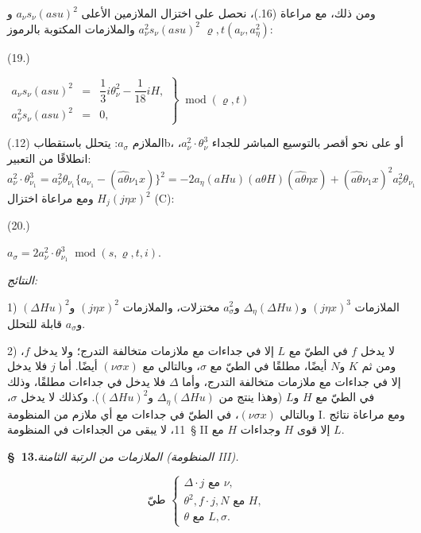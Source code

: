 \documentclass[11pt]{article}
\providecommand{\A}{\Delta}
\providecommand{\R}{\varrho}
\providecommand{\modu}[1]{\;\operatorname{mod} #1}
\begin{document}
ومن ذلك، مع مراعاة (16.)، نحصل على اختزال الملازمين الأعلى $a_\nu s_\nu(asu)^2$ و$a_\nu^2s_\nu(asu)^2$ والملازمات المكتوبة بالرموز $\R,t(a_\nu,a_\eta^2)$:
\par\smallskip\noindent
\begin{minipage}[c]{4.8em}
\centering (19.)
\end{minipage}%
\begin{minipage}[c]{\dimexpr\linewidth-4.8em\relax}
\centering
\(\displaystyle
\left.\begin{array}{rcl}
a_\nu s_\nu(asu)^2&=&\dfrac13 i\theta_\nu^2-\dfrac1{18}iH,\\[0.5em]
a_\nu^2s_\nu(asu)^2&=&0,
\end{array}\right\}\modu{(\R,t)}
\)
\end{minipage}
\par\smallskip
الملازم $a_\sigma$: يتحلل باستقطاب (12.)b، أو على نحو أقصر بالتوسيع المباشر للجداء $a_\nu^2\cdot\theta_\nu^3$، انطلاقًا من التعبير:
\[
a_\nu^2\cdot\theta_{\nu_1}^3=a_\nu^2\theta_{\nu_1}\{a_{\nu_1}-(\widehat{a\theta}\nu_1x)\}^2
=-2a_\eta(aHu)(a\theta H)(\widehat{a\theta}\eta x)+(\widehat{a\theta}\nu_1x)^2a_\nu^2\theta_{\nu_1}
\]
ومع مراعاة اختزال $H_j(j\eta x)^2$ (C):
\par\smallskip\noindent
\begin{minipage}[c]{4.8em}
\centering (20.)
\end{minipage}%
\begin{minipage}[c]{\dimexpr\linewidth-4.8em\relax}
\centering
\(\displaystyle a_\sigma=2a_\nu^2\cdot\theta_{\nu_1}^3\modu{(s,\R,t,i)}.\)
\end{minipage}
\par\smallskip

\noindent\emph{النتائج:}

1) الملازمات $(j\eta x)^3$ و$\A_\eta(\A Hu)$ و$a_\sigma^2$ مختزلات، والملازمات $(j\eta x)^2$ و$(\A Hu)^2$ و$a_\sigma$ قابلة للتحلل.

2) لا يدخل $f$ في الطيّ مع $L$ إلا في جداءات مع ملازمات متخالفة التدرج؛ ولا يدخل $f$، ومن ثم $K$ و$N$ أيضًا، مطلقًا في الطيّ مع $\sigma$، وبالتالي مع $(\nu\sigma x)$ أيضًا. أما $j$ فلا يدخل إلا في جداءات مع ملازمات متخالفة التدرج، وأما $\A$ فلا يدخل في جداءات مطلقًا، وذلك في الطيّ مع $H$ و$L$ (وهذا ينتج من $\A_\eta(\A Hu)$ و$(\A Hu)^2$). وكذلك لا يدخل $\sigma$، وبالتالي $(\nu\sigma x)$، في الطيّ في جداءات مع أي ملازم من المنظومة I. ومع مراعاة نتائج \S\ 11، لا يبقى من الجداءات في المنظومة II إلا قوى $H$ وجداءات $H$ مع $L$.

\begin{center}
\textbf{\S\ 13.}\quad\emph{الملازمات من الرتبة الثامنة (المنظومة III).}
\end{center}
\[
\text{طيّ }\left\{\begin{array}{l}
\A\cdot j\text{ مع }\nu,\\
\theta^2,
 f\cdot j,
 N\text{ مع }H,\\
\theta\text{ مع }L,\sigma.
\end{array}\right.
\]
\end{document}
